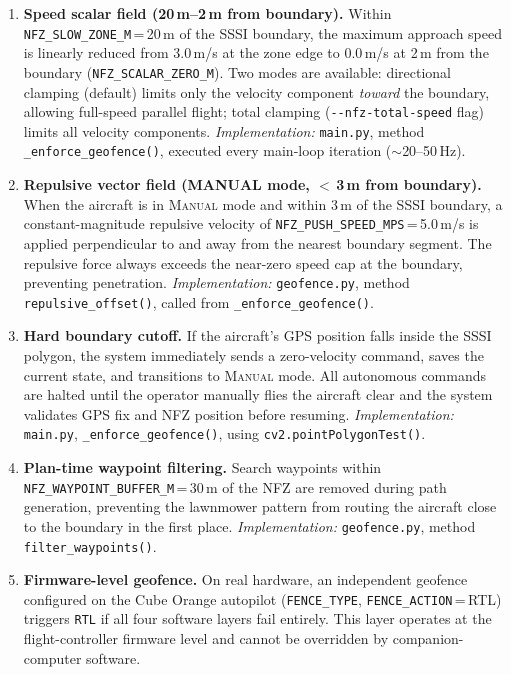 \begin{enumerate}
    \item \textbf{Speed scalar field (20\,m--2\,m from boundary).} Within \texttt{NFZ\_SLOW\_ZONE\_M}\,=\,20\,m of the SSSI boundary, the maximum approach speed is linearly reduced from 3.0\,m/s at the zone edge to 0.0\,m/s at 2\,m from the boundary (\texttt{NFZ\_SCALAR\_ZERO\_M}). Two modes are available: directional clamping (default) limits only the velocity component \emph{toward} the boundary, allowing full-speed parallel flight; total clamping (\texttt{-{}-nfz-total-speed} flag) limits all velocity components.
    \emph{Implementation:} \texttt{main.py}, method \texttt{\_enforce\_geofence()}, executed every main-loop iteration ($\sim$20--50\,Hz).

    \item \textbf{Repulsive vector field (MANUAL mode, $<$\,3\,m from boundary).} When the aircraft is in \textsc{Manual} mode and within 3\,m of the SSSI boundary, a constant-magnitude repulsive velocity of \texttt{NFZ\_PUSH\_SPEED\_MPS}\,=\,5.0\,m/s is applied perpendicular to and away from the nearest boundary segment. The repulsive force always exceeds the near-zero speed cap at the boundary, preventing penetration.
    \emph{Implementation:} \texttt{geofence.py}, method \texttt{repulsive\_offset()}, called from \texttt{\_enforce\_geofence()}.

    \item \textbf{Hard boundary cutoff.} If the aircraft's GPS position falls inside the SSSI polygon, the system immediately sends a zero-velocity command, saves the current state, and transitions to \textsc{Manual} mode. All autonomous commands are halted until the operator manually flies the aircraft clear and the system validates GPS fix and NFZ position before resuming.
    \emph{Implementation:} \texttt{main.py}, \texttt{\_enforce\_geofence()}, using \texttt{cv2.pointPolygonTest()}.

    \item \textbf{Plan-time waypoint filtering.} Search waypoints within \texttt{NFZ\_WAYPOINT\_BUFFER\_M}\,=\,30\,m of the NFZ are removed during path generation, preventing the lawnmower pattern from routing the aircraft close to the boundary in the first place.
    \emph{Implementation:} \texttt{geofence.py}, method \texttt{filter\_waypoints()}.

    \item \textbf{Firmware-level geofence.} On real hardware, an independent geofence configured on the Cube Orange autopilot (\texttt{FENCE\_TYPE}, \texttt{FENCE\_ACTION}\,=\,RTL) triggers \texttt{RTL} if all four software layers fail entirely. This layer operates at the flight-controller firmware level and cannot be overridden by companion-computer software.
\end{enumerate}


